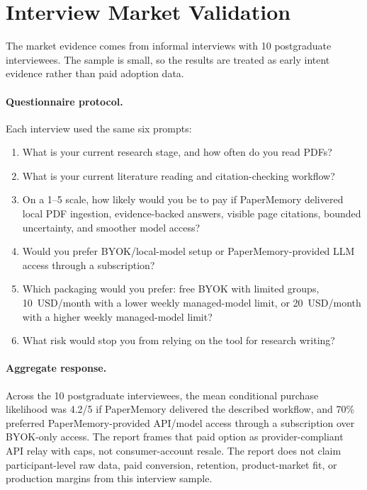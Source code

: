 \section{Interview Market Validation}
\label{app:interview-validation}

The market evidence comes from informal interviews with 10 postgraduate interviewees. The sample is small, so the results are treated as early intent evidence rather than paid adoption data.

\paragraph{Questionnaire protocol.}
Each interview used the same six prompts:
\begin{enumerate}
  \item What is your current research stage, and how often do you read PDFs?
  \item What is your current literature reading and citation-checking workflow?
  \item On a 1--5 scale, how likely would you be to pay if PaperMemory delivered local PDF ingestion, evidence-backed answers, visible page citations, bounded uncertainty, and smoother model access?
  \item Would you prefer BYOK/local-model setup or PaperMemory-provided LLM access through a subscription?
  \item Which packaging would you prefer: free BYOK with limited groups, 10~USD/month with a lower weekly managed-model limit, or 20~USD/month with a higher weekly managed-model limit?
  \item What risk would stop you from relying on the tool for research writing?
\end{enumerate}

\paragraph{Aggregate response.}
Across the 10 postgraduate interviewees, the mean conditional purchase likelihood was 4.2/5 if PaperMemory delivered the described workflow, and 70\% preferred PaperMemory-provided API/model access through a subscription over BYOK-only access. The report frames that paid option as provider-compliant API relay with caps, not consumer-account resale. The report does not claim participant-level raw data, paid conversion, retention, product-market fit, or production margins from this interview sample.


